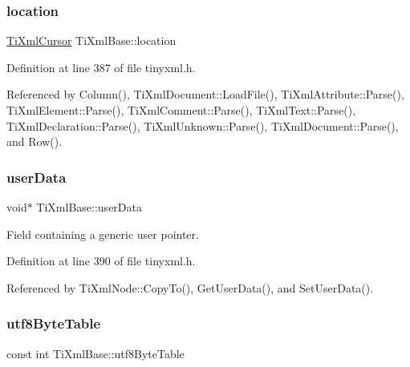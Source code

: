 \subsubsection{\texorpdfstring{location}{location}}
{\footnotesize\ttfamily \hyperlink{struct_ti_xml_cursor}{Ti\+Xml\+Cursor} Ti\+Xml\+Base\+::location\hspace{0.3cm}{\ttfamily [protected]}}



Definition at line 387 of file tinyxml.\+h.



Referenced by Column(), Ti\+Xml\+Document\+::\+Load\+File(), Ti\+Xml\+Attribute\+::\+Parse(), Ti\+Xml\+Element\+::\+Parse(), Ti\+Xml\+Comment\+::\+Parse(), Ti\+Xml\+Text\+::\+Parse(), Ti\+Xml\+Declaration\+::\+Parse(), Ti\+Xml\+Unknown\+::\+Parse(), Ti\+Xml\+Document\+::\+Parse(), and Row().

\hypertarget{class_ti_xml_base_ab242c01590191f644569fa89a080d97c}{}\label{class_ti_xml_base_ab242c01590191f644569fa89a080d97c} 
\subsubsection{\texorpdfstring{user\+Data}{userData}}
{\footnotesize\ttfamily void$\ast$ Ti\+Xml\+Base\+::user\+Data\hspace{0.3cm}{\ttfamily [protected]}}



Field containing a generic user pointer. 



Definition at line 390 of file tinyxml.\+h.



Referenced by Ti\+Xml\+Node\+::\+Copy\+To(), Get\+User\+Data(), and Set\+User\+Data().

\hypertarget{class_ti_xml_base_ac8c86058137bdb4b413c3eca58f2d467}{}\label{class_ti_xml_base_ac8c86058137bdb4b413c3eca58f2d467} 
\subsubsection{\texorpdfstring{utf8\+Byte\+Table}{utf8ByteTable}}
{\footnotesize\ttfamily const int Ti\+Xml\+Base\+::utf8\+Byte\+Table\hspace{0.3cm}{\ttfamily [static]}}

